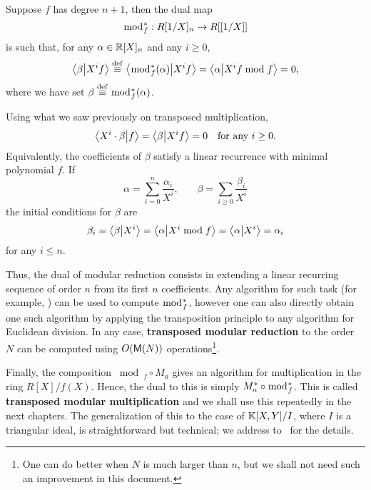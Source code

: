 Suppose $f$ has degree $n+1$, then the dual map
\begin{equation}
  \label{eq:233}
  \bmod_f^\ast:R[1/X]_n\rightarrow R[[1/X]]  
\end{equation}
is such that, for any $\alpha\in\mathbb{R}[X]_n$ and any $i\ge0$,
\begin{equation}
  \label{eq:234}
  \left\langle \beta \middle| X^if \right\rangle \overset{\mathrm{def}}{\equiv} \left\langle \bmod_f^\ast(\alpha) \middle| X^if \right\rangle = 
  \left\langle \alpha \middle| X^if\bmod f \right\rangle = 0
  \text{,}
\end{equation}
where we have set $\beta\overset{\mathrm{def}}{\equiv}\bmod_f^\ast(\alpha)$.

Using what we saw previously on transposed multiplication,
\begin{equation}
  \label{eq:235}
  \left\langle X^i\cdot\beta \middle| f \right\rangle = \left\langle \beta \middle| X^if \right\rangle = 0
  \quad\text{for any $i\ge0$.}
\end{equation}
Equivalently, the coefficients of $\beta$ satisfy a linear recurrence
with minimal polynomial $f$. If
\begin{equation}
  \label{eq:236}
  \alpha = \sum_{i=0}^{n}\frac{\alpha_i}{X^i}
  \text{,}\qquad
  \beta = \sum_{i\ge0}\frac{\beta_i}{X^i}
\end{equation}
the initial conditions for $\beta$ are
\begin{equation}
  \label{eq:237}
  \beta_i = \left\langle \beta \middle| X^i \right\rangle = \left\langle \alpha \middle| X^i\bmod f \right\rangle = \left\langle \alpha \middle| X^i \right\rangle = \alpha_i
\end{equation}
for any $i\le n$.

Thus, the dual of modular reduction consists in extending a linear
recurring sequence of order $n$ from its first $n$ coefficients. Any
algorithm for such task (for example, \cite[$\S$3]{shoup99}) can be
used to compute $\bmod_f^\ast$, however one can also directly obtain
one such algorithm by applying the transposition principle to any
algorithm for Euclidean division. In any case,
\textbf{transposed modular
  reduction} to the order $N$ can be computed using $O(\mathsf{M}(N))$
operations\footnote{One can do better when $N$ is much larger than
  $n$, but we shall not need such an improvement in this document.}.

Finally, the composition $\bmod_f\circ M_a$ gives an algorithm for
multiplication in the ring $R[X]/f(X)$. Hence, the dual to this is
simply $M_a^\ast\circ\bmod_f^\ast$. This is called
\textbf{transposed modular
  multiplication} and we shall use this repeatedly in the next
chapters. The generalization of this to the case of $\mathbb{K}[X,Y]/I$, where
$I$ is a triangular ideal, is straightforward but technical; we
address to~\cite[Corollary~2]{pascal+schost06} for the details.



